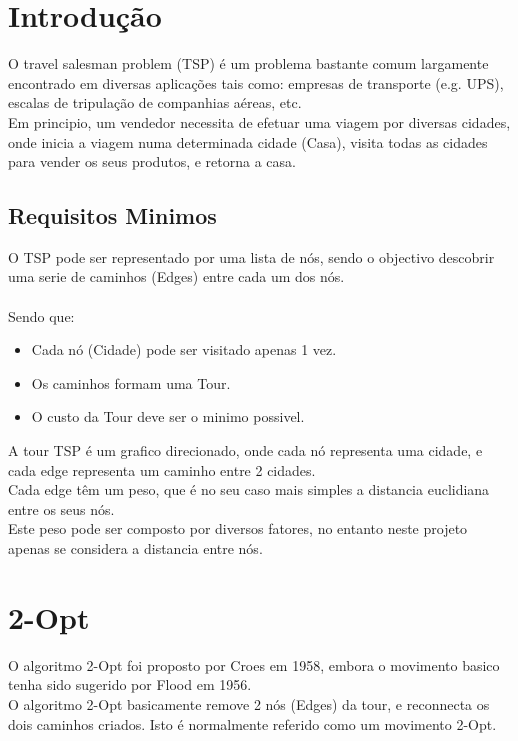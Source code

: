 \documentclass[12pt,a4paper,portrait]{article}
\begin{document}
	
	\tableofcontents
	
	
	\newpage
	\section{Introdução}
		O travel salesman problem (TSP) é um problema bastante comum largamente encontrado em diversas aplicações tais como: empresas de transporte (e.g. UPS), escalas de tripulação de companhias aéreas, etc.\\
		Em principio, um vendedor necessita de efetuar uma viagem por diversas cidades, onde inicia a viagem numa determinada cidade (Casa), visita todas as cidades para vender os seus produtos, e retorna a casa.\\
		\subsection{Requisitos Minimos}	
			O TSP pode ser representado por uma lista de nós, sendo o objectivo descobrir uma serie de caminhos (Edges) entre cada um dos nós.\\\\
			Sendo que:\\
			\begin{itemize}
				\item Cada nó (Cidade) pode ser visitado apenas 1 vez.
				\item Os caminhos formam uma Tour.
				\item O custo da Tour deve ser o minimo possivel.
			\end{itemize}
			A tour TSP é um grafico direcionado, onde cada nó representa uma cidade, e cada edge representa um caminho entre 2 cidades.\\
			Cada edge têm um peso, que é no seu caso mais simples a distancia euclidiana entre os seus nós.\\
			Este peso pode ser composto por diversos fatores, no entanto neste projeto apenas se considera a distancia entre nós.\\ 			
			\newpage
	\section{2-Opt} \label{ssec:num1}
			O algoritmo 2-Opt foi proposto por Croes em 1958, embora o movimento basico tenha sido sugerido por Flood em 1956.\\ 
			O algoritmo 2-Opt basicamente remove 2 nós (Edges) da tour, e reconnecta os dois caminhos criados. Isto é normalmente referido como um movimento 2-Opt.\\
\end{document}
